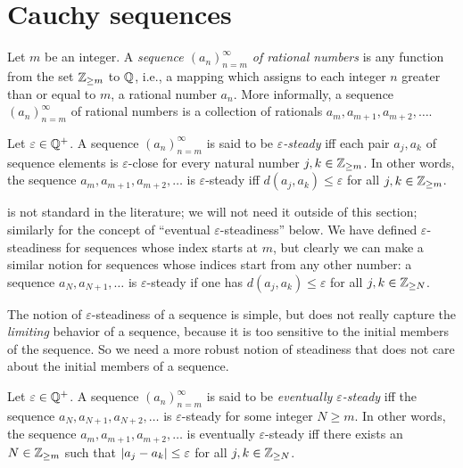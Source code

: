 \section{Cauchy sequences}\label{i:sec:5.1}

\begin{defn}[Sequences]\label{i:5.1.1}
  Let \(m\) be an integer.
  A \emph{sequence \((a_n)_{n = m}^{\infty}\) of rational numbers} is any function from the set \(\mathbb{Z}_{\geq m}\) to \(\mathbb{Q}\), i.e., a mapping which assigns to each integer \(n\) greater than or equal to \(m\), a rational number \(a_n\).
  More informally, a sequence \((a_n)_{n = m}^{\infty}\) of rational numbers is a collection of rationals \(a_m, a_{m + 1}, a_{m + 2}, \dots\).
\end{defn}

\setcounter{thm}{2}
\begin{defn}\label{i:5.1.3}
  Let \(\varepsilon \in \mathbb{Q}^+\).
  A sequence \((a_n)_{n = m}^{\infty}\) is said to be \emph{\(\varepsilon\)-steady} iff each pair \(a_j, a_k\) of sequence elements is \(\varepsilon\)-close for every natural number \(j, k \in \mathbb{Z}_{\geq m}\).
  In other words, the sequence \(a_m, a_{m + 1}, a_{m + 2}, \dots\) is \(\varepsilon\)-steady iff \(d(a_j, a_k) \leq \varepsilon\) for all \(j, k \in \mathbb{Z}_{\geq m}\).
\end{defn}

\begin{rmk}\label{i:5.1.4}
   is not standard in the literature;
  we will not need it outside of this section;
  similarly for the concept of ``eventual \(\varepsilon\)-steadiness'' below.
  We have defined \(\varepsilon\)-steadiness for sequences whose index starts at \(m\), but clearly we can make a similar notion for sequences whose indices start from any other number:
  a sequence \(a_N, a_{N + 1}, \dots\) is \(\varepsilon\)-steady if one has \(d(a_j, a_k) \leq \varepsilon\) for all \(j, k \in \mathbb{Z}_{\geq N}\).
\end{rmk}

\begin{note}
  The notion of \(\varepsilon\)-steadiness of a sequence is simple, but does not really capture the \emph{limiting} behavior of a sequence, because it is too sensitive to the initial members of the sequence.
  So we need a more robust notion of steadiness that does not care about the initial members of a sequence.
\end{note}

\setcounter{thm}{5}
\begin{defn}\label{i:5.1.6}
  Let \(\varepsilon \in \mathbb{Q}^+\).
  A sequence \((a_n)_{n = m}^{\infty}\) is said to be \emph{eventually \(\varepsilon\)-steady} iff the sequence \(a_N, a_{N + 1}, a_{N + 2}, \dots\) is \(\varepsilon\)-steady for some integer \(N \geq m\).
  In other words, the sequence \(a_m, a_{m + 1}, a_{m + 2}, \dots\) is eventually \(\varepsilon\)-steady iff there exists an \(N \in \mathbb{Z}_{\geq m}\) such that \(\left\lvert a_j - a_k\right\rvert \leq \varepsilon\) for all \(j, k \in \mathbb{Z}_{\geq N}\).
\end{defn}

